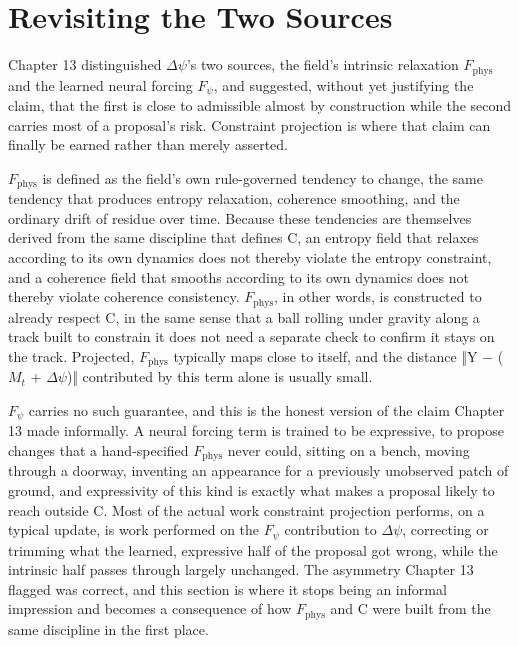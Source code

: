 \section{Revisiting the Two Sources}

Chapter 13 distinguished \(\Delta\psi\)'s two sources, the field's intrinsic relaxation \(F_{\mathrm{phys}}\) and the learned neural forcing \(F_\psi\), and suggested, without yet justifying the claim, that the first is close to admissible almost by construction while the second carries most of a proposal's risk. Constraint projection is where that claim can finally be earned rather than merely asserted.

\(F_{\mathrm{phys}}\) is defined as the field's own rule-governed tendency to change, the same tendency that produces entropy relaxation, coherence smoothing, and the ordinary drift of residue over time. Because these tendencies are themselves derived from the same discipline that defines C, an entropy field that relaxes according to its own dynamics does not thereby violate the entropy constraint, and a coherence field that smooths according to its own dynamics does not thereby violate coherence consistency. \(F_{\mathrm{phys}}\), in other words, is constructed to already respect C, in the same sense that a ball rolling under gravity along a track built to constrain it does not need a separate check to confirm it stays on the track. Projected, \(F_{\mathrm{phys}}\) typically maps close to itself, and the distance ‖Y − (\(M_t\) + \(\Delta\psi\))‖ contributed by this term alone is usually small.

\(F_\psi\) carries no such guarantee, and this is the honest version of the claim Chapter 13 made informally. A neural forcing term is trained to be expressive, to propose changes that a hand-specified \(F_{\mathrm{phys}}\) never could, sitting on a bench, moving through a doorway, inventing an appearance for a previously unobserved patch of ground, and expressivity of this kind is exactly what makes a proposal likely to reach outside C. Most of the actual work constraint projection performs, on a typical update, is work performed on the \(F_\psi\) contribution to \(\Delta\psi\), correcting or trimming what the learned, expressive half of the proposal got wrong, while the intrinsic half passes through largely unchanged. The asymmetry Chapter 13 flagged was correct, and this section is where it stops being an informal impression and becomes a consequence of how \(F_{\mathrm{phys}}\) and C were built from the same discipline in the first place.

